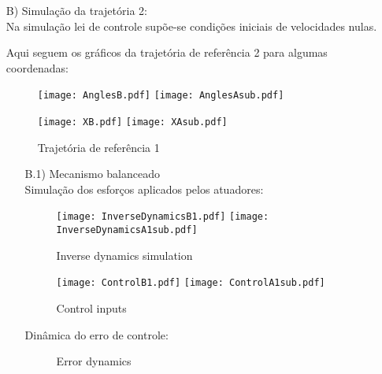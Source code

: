 \begin{itemize}
\item[B)] Simula\c{c}\~ao da trajet\'oria 2: \\

Na simula\c{c}\~ao lei de controle sup\~oe-se condi\c{c}\~oes iniciais de velocidades nulas.

Aqui seguem os gr\'aficos da trajet\'oria de refer\^encia 2 para algumas coordenadas:

\begin{figure}[ht]
\centering
\begin{minipage}[b]{0.45\linewidth}
\texttt{[image: AnglesB.pdf]}
\texttt{[image: AnglesAsub.pdf]}
\label{fig:AnglesB}
\end{minipage}
\quad
\begin{minipage}[b]{0.45\linewidth}
\texttt{[image: XB.pdf]}
\texttt{[image: XAsub.pdf]}
\label{fig:XB}
\end{minipage}
\caption{Trajet\'oria de refer\^encia 1}
\end{figure}

\begin{itemize}
\item[B.1)] Mecanismo balanceado \\

Simula\c{c}\~ao dos esfor\c{c}os aplicados pelos atuadores:

\begin{figure}[H]
\centering
\begin{minipage}[b]{0.45\linewidth}
\texttt{[image: InverseDynamicsB1.pdf]}
\texttt{[image: InverseDynamicsA1sub.pdf]}
\label{fig:InverseDynamicsB1}
\caption{Inverse dynamics simulation}
\end{minipage}
\quad
\begin{minipage}[b]{0.45\linewidth}
\texttt{[image: ControlB1.pdf]}
\texttt{[image: ControlA1sub.pdf]}
\label{fig:ControlB1}
\caption{Control inputs}
\end{minipage}
\end{figure}

Din\^amica do erro de controle:

\begin{figure}[H]
\centering
{}
\quad
{}
%
\caption{Error dynamics}
\label{fig:figure}
\end{figure}


\end{itemize}
\end{itemize}
